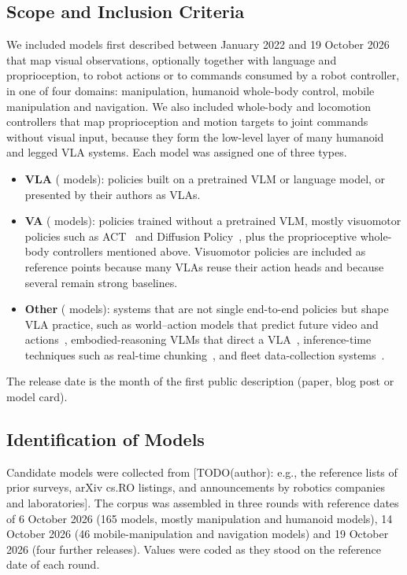 \documentclass[applsci,review,submit,pdftex,oneauthor]{Definitions/mdpi}
\begin{document}
\subsection{Scope and Inclusion Criteria}

We included models first described between January 2022 and 19 October 2026 that map visual observations, optionally together with language and proprioception, to robot actions or to commands consumed by a robot controller, in one of four domains: manipulation, humanoid whole-body control, mobile manipulation and navigation. We also included whole-body and locomotion controllers that map proprioception and motion targets to joint commands without visual input, because they form the low-level layer of many humanoid and legged VLA systems. Each model was assigned one of three types.
\begin{itemize}
\item \textbf{VLA} (\nVLA{} models): policies built on a pretrained VLM or language model, or presented by their authors as VLAs.
\item \textbf{VA} (\nVA{} models): policies trained without a pretrained VLM, mostly visuomotor policies such as ACT~\cite{ax230413705} and Diffusion Policy~\cite{ax230304137}, plus the proprioceptive whole-body controllers mentioned above. Visuomotor policies are included as reference points because many VLAs reuse their action heads and because several remain strong baselines.
\item \textbf{Other} (\nOther{} models): systems that are not single end-to-end policies but shape VLA practice, such as world--action models that predict future video and actions~\cite{ax260116163,ax260215922}, embodied-reasoning VLMs that direct a VLA~\cite{ax250320020}, inference-time techniques such as real-time chunking~\cite{ax250607339}, and fleet data-collection systems~\cite{ax240112963}.
\end{itemize}
The release date is the month of the first public description (paper, blog post or model card).

\subsection{Identification of Models}

Candidate models were collected from [TODO(author): e.g., the reference lists of prior surveys, arXiv cs.RO listings, and announcements by robotics companies and laboratories]. The corpus was assembled in three rounds with reference dates of 6 October 2026 (165 models, mostly manipulation and humanoid models), 14 October 2026 (46 mobile-manipulation and navigation models) and 19 October 2026 (four further releases). Values were coded as they stood on the reference date of each round.
\end{document}
